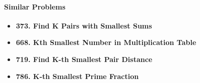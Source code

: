 \paragraph{Similar Problems}
\begin{itemize}
\item \textbf{373. Find K Pairs with Smallest Sums}
\item \textbf{668. Kth Smallest Number in Multiplication Table}
\item \textbf{719. Find K-th Smallest Pair Distance}
\item \textbf{786. K-th Smallest Prime Fraction}
\end{itemize}